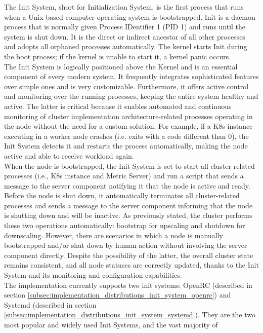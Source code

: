 The Init System, short for Initialization System, is the first process that runs
when a Unix-based computer operating system is bootstrapped. Init is a daemon
process that is normally given Process IDentifier 1 (PID 1) and runs until the
system is shut down. It is the direct or indirect ancestor of all other processes
and adopts all orphaned processes automatically. The kernel starts Init during
the boot process; if the kernel is unable to start it, a kernel panic occurs\cite{init_system}.
\\ %
The Init System is logically positioned above the Kernel and is an essential component
of every modern system. It frequently integrates sophisticated features over
simple ones and is very customizable. Furthermore, it offers active control and
monitoring over the running processes, keeping the entire system healthy and active.
The latter is critical because it enables automated and continuous monitoring of
cluster implementation architecture-related processes operating in the node
without the need for a custom solution. For example, if a K8s instance executing
in a worker node crashes (i.e. exits with a code different than 0), the Init
System detects it and restarts the process automatically, making the node active
and able to receive workload again. \\ %
When the node is bootstrapped, the Init System is set to start all cluster-related
processes (i.e., K8s instance and Metric Server) and run a script that sends a
message to the server component notifying it that the node is active and ready. Before
the node is shut down, it automatically terminates all cluster-related processes
and sends a message to the server component informing that the node is shutting
down and will be inactive. As previously stated, the cluster performs these two
operations automatically: bootstrap for upscaling and shutdown for downscaling.
However, there are scenarios in which a node is manually bootstrapped and/or shut
down by human action without involving the server component directly. Despite
the possibility of the latter, the overall cluster state remains consistent, and
all node statuses are correctly updated, thanks to the Init System and its monitoring
and configuration capabilities. \\ %
The implementation currently supports two init systems: OpenRC (described in section
\ref{subsec:implementation_distributions_init_system_openrc}) and Systemd (described
in section \ref{subsec:implementation_distributions_init_system_systemd}). They are
the two most popular and widely used Init Systems, and the vast majority of

